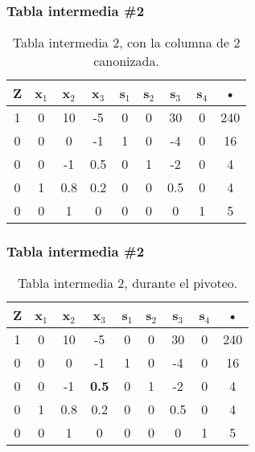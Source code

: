 \documentclass{beamer}
\begin{document}
 
\begin{frame}  
\frametitle{Tabla intermedia \#2} 
\begin{table}[H] 
\begin{center} 
\begin{tabular}{|*{9}{c|}} 
\hline 
\textbf{Z}  & \cellcolor{color_columna_candidata}\textcolor{color_blanco}{\textbf{x$_{1}$}} & \textbf{x$_{2}$} & \textbf{x$_{3}$} & \textbf{s$_{1}$} & \textbf{s$_{2}$} & \textbf{s$_{3}$} & \textbf{s$_{4}$} & \textbf{•} \\\hline \hline 
1 & \cellcolor{color_columna_candidata}\textcolor{color_blanco}{0} & 10 & -5 & 0 & 0 & 30 & 0 & 240 \\\hline 
0 & \cellcolor{color_columna_candidata}\textcolor{color_blanco}{0} & 0 & -1 & 1 & 0 & -4 & 0 & 16\\ 
\hline 
0 & \cellcolor{color_columna_candidata}\textcolor{color_blanco}{0} & -1 & 0.5 & 0 & 1 & -2 & 0 & 4\\ 
\hline 
0 & \cellcolor{color_columna_candidata}\textcolor{color_blanco}{1} & 0.8 & 0.2 & 0 & 0 & 0.5 & 0 & 4\\ 
\hline 
0 & \cellcolor{color_columna_candidata}\textcolor{color_blanco}{0} & 1 & 0 & 0 & 0 & 0 & 1 & 5\\ 
\hline 
\end{tabular} 
\caption{Tabla intermedia 2, con la columna de 2 canonizada.} 
\end{center} 
\end{table} 
\end{frame} 
 
 
\begin{frame}  
\frametitle{Tabla intermedia \#2} 
\begin{table}[H] 
\begin{center} 
\begin{tabular}{|*{9}{c|}} 
\hline 
\textbf{Z}  & \textbf{x$_{1}$} & \textbf{x$_{2}$} & \cellcolor{color_columna_candidata}\textcolor{color_blanco}{\textbf{x$_{3}$}} & \textbf{s$_{1}$} & \textbf{s$_{2}$} & \textbf{s$_{3}$} & \textbf{s$_{4}$} & \textbf{•} \\\hline \hline 
1 & 0 & 10 & \cellcolor{color_columna_candidata}\textcolor{color_blanco}{-5} & 0 & 0 & 30 & 0 & 240 \\\hline 
0 & 0 & 0 & \cellcolor{color_columna_candidata}\textcolor{color_blanco}{-1} & 1 & 0 & -4 & 0 & 16\\ 
\hline 
0 & 0 & -1 & \cellcolor{color_pivote}\textbf{0.5} & 0 & 1 & -2 & 0 & 4\\ 
\hline 
0 & 1 & 0.8 & \cellcolor{color_columna_candidata}\textcolor{color_blanco}{0.2} & 0 & 0 & 0.5 & 0 & 4\\ 
\hline 
0 & 0 & 1 & \cellcolor{color_columna_candidata}\textcolor{color_blanco}{0} & 0 & 0 & 0 & 1 & 5\\ 
\hline 
\end{tabular} 
\caption{Tabla intermedia 2, durante el pivoteo.} 
\end{center} 
\end{table} 
\end{frame} 
 
\end{document}
